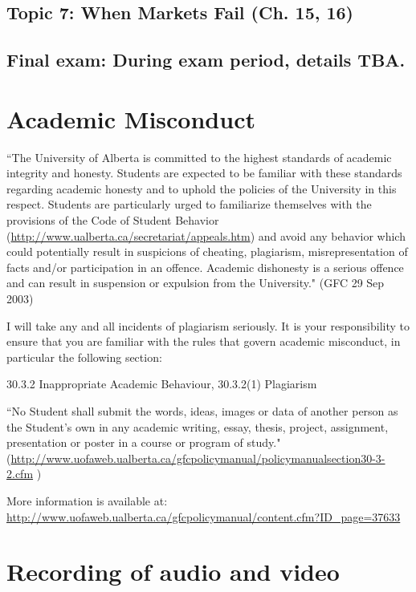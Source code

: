 \documentclass[11pt,]{article}
\begin{document}
\hypertarget{topic-7-when-markets-fail-ch.-15-16}{%
\subsection{Topic 7: When Markets Fail (Ch. 15,
16)}\label{topic-7-when-markets-fail-ch.-15-16}}

\hypertarget{final-exam-during-exam-period-details-tba.}{%
\subsection{Final exam: During exam period, details
TBA.}\label{final-exam-during-exam-period-details-tba.}}

\hypertarget{academic-misconduct}{%
\section{Academic Misconduct}\label{academic-misconduct}}

``The University of Alberta is committed to the highest standards of
academic integrity and honesty. Students are expected to be familiar
with these standards regarding academic honesty and to uphold the
policies of the University in this respect. Students are particularly
urged to familiarize themselves with the provisions of the Code of
Student Behavior (\url{http://www.ualberta.ca/secretariat/appeals.htm})
and avoid any behavior which could potentially result in suspicions of
cheating, plagiarism, misrepresentation of facts and/or participation in
an offence. Academic dishonesty is a serious offence and can result in
suspension or expulsion from the University." (GFC 29 Sep 2003)

I will take any and all incidents of plagiarism seriously. It is your
responsibility to ensure that you are familiar with the rules that
govern academic misconduct, in particular the following section:

30.3.2 Inappropriate Academic Behaviour, 30.3.2(1) Plagiarism

``No Student shall submit the words, ideas, images or data of another
person as the Student's own in any academic writing, essay, thesis,
project, assignment, presentation or poster in a course or program of
study."
(\url{http://www.uofaweb.ualberta.ca/gfcpolicymanual/policymanualsection30-3-2.cfm}
)

More information is available at:
\url{http://www.uofaweb.ualberta.ca/gfcpolicymanual/content.cfm?ID_page=37633}


\hypertarget{recording-of-audio-and-video}{%
\section{Recording of audio and
video}\label{recording-of-audio-and-video}}
\end{document}
